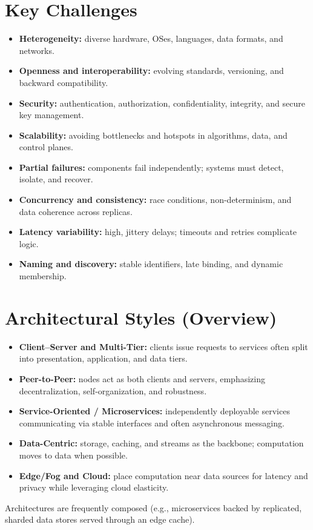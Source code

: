 \documentclass[a4paper,12pt]{book}
\begin{document}
\section{Key Challenges}
\begin{itemize}
  \item \textbf{Heterogeneity:} diverse hardware, OSes, languages, data formats, and networks.
  \item \textbf{Openness and interoperability:} evolving standards, versioning, and backward compatibility.
  \item \textbf{Security:} authentication, authorization, confidentiality, integrity, and secure key management.
  \item \textbf{Scalability:} avoiding bottlenecks and hotspots in algorithms, data, and control planes.
  \item \textbf{Partial failures:} components fail independently; systems must detect, isolate, and recover.
  \item \textbf{Concurrency and consistency:} race conditions, non-determinism, and data coherence across replicas.
  \item \textbf{Latency variability:} high, jittery delays; timeouts and retries complicate logic.
  \item \textbf{Naming and discovery:} stable identifiers, late binding, and dynamic membership.
\end{itemize}

\section{Architectural Styles (Overview)}
\begin{itemize}
  \item \textbf{Client--Server and Multi-Tier:} clients issue requests to services often split into presentation, application, and data tiers.
  \item \textbf{Peer-to-Peer:} nodes act as both clients and servers, emphasizing decentralization, self-organization, and robustness.
  \item \textbf{Service-Oriented / Microservices:} independently deployable services communicating via stable interfaces and often asynchronous messaging.
  \item \textbf{Data-Centric:} storage, caching, and streams as the backbone; computation moves to data when possible.
  \item \textbf{Edge/Fog and Cloud:} place computation near data sources for latency and privacy while leveraging cloud elasticity.
\end{itemize}
Architectures are frequently composed (e.g., microservices backed by replicated, sharded data stores served through an edge cache).
\end{document}
